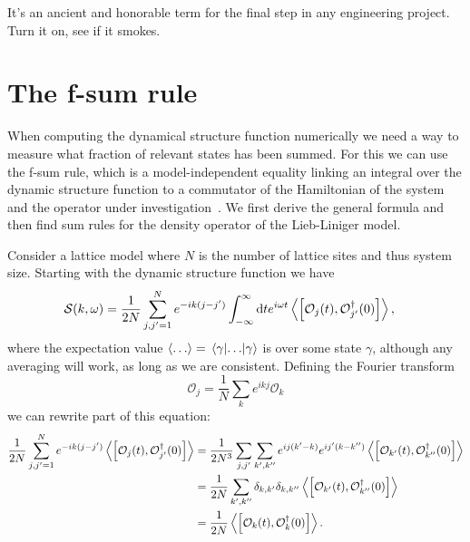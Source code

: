\documentclass[11pt, a4paper]{report} %
\begin{document}
\begin{savequote}[50mm]
It's an ancient and honorable term for the final step in any engineering project. Turn it on, see if it smokes.
\end{savequote}

\chapter{The f-sum rule}\label{cha:f-sum-rule}

When computing the dynamical structure function numerically we need a way to measure what fraction of relevant states has been summed.
For this we can use the f-sum rule, which is a model-independent equality linking an integral over the dynamic structure function to a commutator of the Hamiltonian of the system and the operator under investigation~\cite{pitaevskii}.
We first derive the general formula and then find sum rules for the density operator of the Lieb-Liniger model.

Consider a lattice model where \(N\) is the number of lattice sites and thus system size.
Starting with the dynamic structure function we have
\begin{align}
  	\mathcal{S}(k,\omega) &= \frac{1}{2N} \sum_{j,j'=1}^{N} e^{-ik(j-j')} \int_{-\infty}^{\infty}\dd t e^{i\omega t}\expval{\qty[\mathcal{O}_j(t),\mathcal{O}_{j'}^{\dagger}(0)]},
\end{align}
where the expectation value \(\expval{\ldots} = \matrixel{\gamma}{\ldots}{\gamma}\) is over some state \(\gamma\), although any averaging will work, as long as we are consistent.
Defining the Fourier transform
\begin{equation}
  \mathcal{O}_j = \frac{1}{N} \sum_k e^{ikj} \mathcal{O}_k
\end{equation}
we can rewrite part of this equation:
\begin{align}
  \frac{1}{2N} \sum_{j,j'=1}^{N} e^{-ik(j-j')} \expval{\qty[\mathcal{O}_j(t),\mathcal{O}_{j'}^{\dagger}(0)]} &= \frac{1}{2N^3} \sum_{j, j'}\sum_{k',k''} e^{ij(k'-k)}e^{ij'(k-k'')}  \expval{\qty[\mathcal{O}_{k'}(t),\mathcal{O}_{k''}^{\dagger}(0)]}\\
&= \frac{1}{2N} \sum_{k',k''} \delta_{k,k'}\delta_{k,k''}  \expval{\qty[\mathcal{O}_{k'}(t),\mathcal{O}_{k''}^{\dagger}(0)]} \\
&= \frac{1}{2N}  \expval{\qty[\mathcal{O}_{k}(t),\mathcal{O}_{k}^{\dagger}(0)]}.
\end{align}
\end{document}
